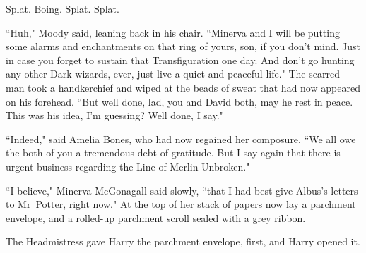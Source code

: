 Splat. Boing. Splat. Splat.

``Huh," Moody said, leaning back in his chair. ``Minerva and I will be putting some alarms and enchantments on that ring of yours, son, if you don't mind. Just in case you forget to sustain that Transfiguration one day. And don't go hunting any other Dark wizards, ever, just live a quiet and peaceful life." The scarred man took a handkerchief and wiped at the beads of sweat that had now appeared on his forehead. ``But well done, lad, you and David both, may he rest in peace. This was his idea, I'm guessing? Well done, I say."

``Indeed," said Amelia Bones, who had now regained her composure. ``We all owe the both of you a tremendous debt of gratitude. But I say again that there is urgent business regarding the Line of Merlin Unbroken."

``I believe," Minerva McGonagall said slowly, ``that I had best give Albus's letters to Mr~Potter, right now." At the top of her stack of papers now lay a parchment envelope, and a rolled-up parchment scroll sealed with a grey ribbon.

The Headmistress gave Harry the parchment envelope, first, and Harry opened it.

\later


